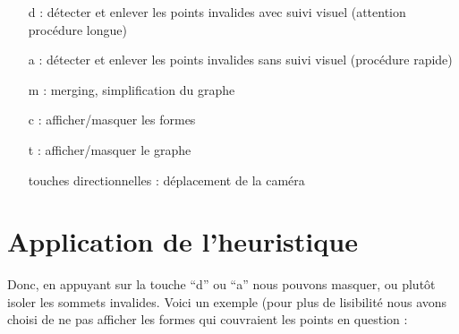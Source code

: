 \documentclass[a4paper,12pt]{report}
\begin{document}
\begin{itemize}
 \item[d] : détecter et enlever les points invalides avec suivi visuel (attention procédure longue)
 \item[a] : détecter et enlever les points invalides sans suivi visuel (procédure rapide)
 \item[m] : merging, simplification du graphe
 \item[c] : afficher/masquer les formes
 \item[t] : afficher/masquer le graphe
 \item[touches directionnelles] : déplacement de la caméra
\end{itemize}


\section{Application de l'heuristique}

Donc, en appuyant sur la touche ``d'' ou ``a'' nous pouvons masquer, ou plutôt isoler les sommets invalides. Voici un exemple (pour plus de lisibilité nous avons choisi de ne pas afficher les formes qui couvraient les points en question : 
\end{document}
